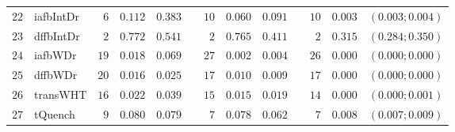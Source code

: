 \begin{table*}[!htbp]
\begin{tabular}{@{}rlrrrrrrrrrcc@{}}
\footnotesize{$22$} & \footnotesize{iafbIntDr} & \footnotesize{$6 $} & \footnotesize{$0.112$} & \footnotesize{$0.383$} && \footnotesize{$10$} & \footnotesize{$0.060$} & \footnotesize{$0.091$} && \footnotesize{$10$} & \footnotesize{$0.003$} & \footnotesize{$(0.003;0.004)$} \\
\footnotesize{$23$} & \footnotesize{dffbIntDr} & \footnotesize{$2 $} & \footnotesize{$0.772$} & \footnotesize{$0.541$} && \footnotesize{$2 $} & \footnotesize{$0.765$} & \footnotesize{$0.411$} && \footnotesize{$2 $} & \footnotesize{$0.315$} & \footnotesize{$(0.284;0.350)$} \\
\footnotesize{$24$} & \footnotesize{iafbWDr  } & \footnotesize{$19$} & \footnotesize{$0.018$} & \footnotesize{$0.069$} && \footnotesize{$27$} & \footnotesize{$0.002$} & \footnotesize{$0.004$} && \footnotesize{$26$} & \footnotesize{$0.000$} & \footnotesize{$(0.000;0.000)$} \\
\footnotesize{$25$} & \footnotesize{dffbWDr  } & \footnotesize{$20$} & \footnotesize{$0.016$} & \footnotesize{$0.025$} && \footnotesize{$17$} & \footnotesize{$0.010$} & \footnotesize{$0.009$} && \footnotesize{$17$} & \footnotesize{$0.000$} & \footnotesize{$(0.000;0.000)$} \\
\footnotesize{$26$} & \footnotesize{transWHT } & \footnotesize{$16$} & \footnotesize{$0.022$} & \footnotesize{$0.039$} && \footnotesize{$15$} & \footnotesize{$0.015$} & \footnotesize{$0.019$} && \footnotesize{$14$} & \footnotesize{$0.000$} & \footnotesize{$(0.000;0.001)$} \\
\footnotesize{$27$} & \footnotesize{tQuench  } & \footnotesize{$9 $} & \footnotesize{$0.080$} & \footnotesize{$0.079$} && \footnotesize{$7 $} & \footnotesize{$0.078$} & \footnotesize{$0.062$} && \footnotesize{$7 $} & \footnotesize{$0.008$} & \footnotesize{$(0.007;0.009)$} \\
\bottomrule
\end{tabular}
\end{table*}
\clearpage


